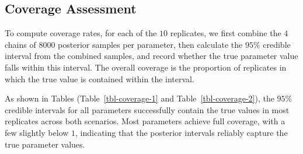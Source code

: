 \documentclass[
  letterpaper,
  double,
  12pt,
  1.0in]{beavtex}
\begin{document}
\subsection{Coverage Assessment}\label{coverage-assessment}

To compute coverage rates, for each of the \(10\) replicates, we first
combine the \(4\) chains of \(8000\) posterior samples per parameter,
then calculate the \(95\%\) credible interval from the combined samples,
and record whether the true parameter value falls within this interval.
The overall coverage is the proportion of replicates in which the true
value is contained within the interval.

As shown in Tables (Table~\ref{tbl-coverage-1} and
Table~\ref{tbl-coverage-2}), the \(95\%\) credible intervals for all
parameters successfully contain the true values in most replicates
across both scenarios. Most parameters achieve full coverage, with a few
slightly below \(1\), indicating that the posterior intervals reliably
capture the true parameter values.

\begin{table}

\caption{\label{tbl-coverage-1}Coverage Rates for All Parameters Across 10 Replicates for Scenario 1}


\end{table}%

\begin{table}

\caption{\label{tbl-coverage-2}Coverage Rates for All Parameters Across 10 Replicates for Scenario 2}


\end{table}%
\end{document}
